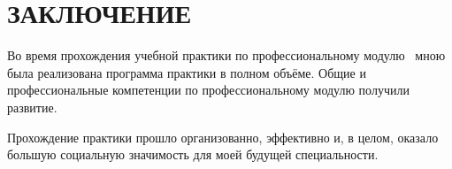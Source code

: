 \chapter*{ЗАКЛЮЧЕНИЕ}

Во время прохождения учебной практики по профессиональному
модулю \module\ мною была реализована программа практики в полном
объёме. Общие и профессиональные компетенции по профессиональному
модулю получили развитие.

Прохождение практики прошло организованно, эффективно и, в целом,
оказало большую социальную значимость для моей будущей специальности.